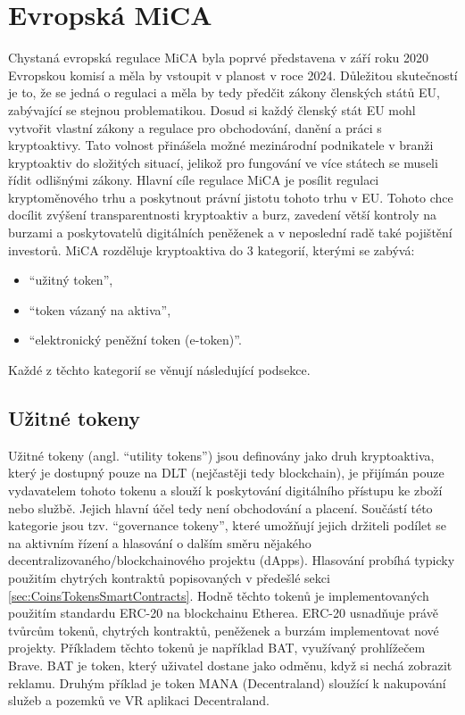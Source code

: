 \section*{Evropská MiCA}
Chystaná evropská regulace MiCA \cite{mica} byla poprvé představena v září roku 2020 Evropskou komisí a měla by vstoupit v planost v roce 2024. Důležitou skutečností je to, že se jedná o regulaci
a měla by tedy předčit zákony členských států EU, zabývající se stejnou problematikou. Dosud si každý členský stát EU mohl vytvořit vlastní zákony a regulace pro obchodování, danění
a práci s kryptoaktivy. Tato volnost přinášela možné mezinárodní podnikatele v branži kryptoaktiv do složitých situací, jelikož pro fungování ve více státech se museli řídit odlišnými
zákony. Hlavní cíle regulace MiCA je posílit regulaci kryptoměnového trhu a poskytnout právní jistotu tohoto trhu v EU. Tohoto chce docílit zvýšení transparentnosti kryptoaktiv a burz,
zavedení větší kontroly na burzami a poskytovatelů digitálních peněženek a v neposlední radě také pojištění investorů. 
MiCA rozděluje kryptoaktiva do 3 kategorií, kterými se zabývá:
\begin{itemize}
    \item \enquote{užitný token},
    \item \enquote{token vázaný na aktiva},
    \item \enquote{elektronický peněžní token (e-token)}.
\end{itemize}
Každé z těchto kategorií se věnují následující podsekce.

\subsection{Užitné tokeny}
Užitné tokeny (angl. \enquote{utility tokens}) jsou definovány jako druh kryptoaktiva, který je dostupný pouze na DLT (nejčastěji tedy blockchain), je přijímán pouze vydavatelem tohoto
tokenu a slouží k poskytování digitálního přístupu ke zboží nebo službě. Jejich hlavní účel tedy není obchodování a placení. Součástí této kategorie jsou tzv. \enquote{governance tokeny},
které umožňují jejich držiteli podílet se na aktivním řízení a hlasování o dalším směru nějakého decentralizovaného/blockchainového projektu (dApps). Hlasování probíhá typicky
použitím chytrých kontraktů popisovaných v předešlé sekci \ref{sec:CoinsTokensSmartContracts}. Hodně těchto tokenů je implementovaných použitím standardu ERC-20 na blockchainu Etherea.
ERC-20 usnadňuje právě tvůrcům tokenů, chytrých kontraktů, peněženek a burzám implementovat nové projekty. Příkladem těchto tokenů je například BAT, využívaný prohlížečem Brave.
BAT je token, který uživatel dostane jako odměnu, když si nechá zobrazit reklamu. Druhým příklad je token MANA (Decentraland) sloužící k nakupování služeb a pozemků ve VR aplikaci
Decentraland.


